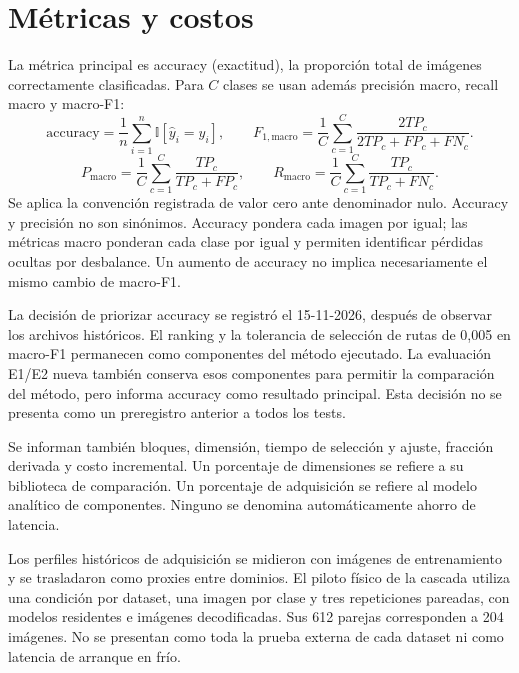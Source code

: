 \section{Métricas y costos}
La métrica principal es accuracy (exactitud), la proporción total de imágenes correctamente clasificadas. Para \(C\) clases se usan además precisión macro, recall macro y macro-F1:
\begin{equation}
\mathrm{accuracy}=\frac{1}{n}\sum_{i=1}^{n}\mathbb I[\widehat y_i=y_i],\qquad
F_{1,\mathrm{macro}}=\frac1C\sum_{c=1}^{C}
\frac{2TP_c}{2TP_c+FP_c+FN_c}.
\label{eq:tk-metrics}
\end{equation}
\begin{equation}
P_{\mathrm{macro}}=\frac1C\sum_{c=1}^{C}\frac{TP_c}{TP_c+FP_c},\qquad
R_{\mathrm{macro}}=\frac1C\sum_{c=1}^{C}\frac{TP_c}{TP_c+FN_c}.
\end{equation}
Se aplica la convención registrada de valor cero ante denominador nulo. Accuracy y precisión no son sinónimos. Accuracy pondera cada imagen por igual; las métricas macro ponderan cada clase por igual y permiten identificar pérdidas ocultas por desbalance. Un aumento de accuracy no implica necesariamente el mismo cambio de macro-F1.

La decisión de priorizar accuracy se registró el 15-11-2026, después de observar los archivos históricos. El ranking y la tolerancia de selección de rutas de 0,005 en macro-F1 permanecen como componentes del método ejecutado. La evaluación E1/E2 nueva también conserva esos componentes para permitir la comparación del método, pero informa accuracy como resultado principal. Esta decisión no se presenta como un preregistro anterior a todos los tests.

Se informan también bloques, dimensión, tiempo de selección y ajuste, fracción derivada y costo incremental. Un porcentaje de dimensiones se refiere a su biblioteca de comparación. Un porcentaje de adquisición se refiere al modelo analítico de componentes. Ninguno se denomina automáticamente ahorro de latencia.

Los perfiles históricos de adquisición se midieron con imágenes de entrenamiento y se trasladaron como proxies entre dominios. El piloto físico de la cascada utiliza una condición por dataset, una imagen por clase y tres repeticiones pareadas, con modelos residentes e imágenes decodificadas. Sus 612 parejas corresponden a 204 imágenes. No se presentan como toda la prueba externa de cada dataset ni como latencia de arranque en frío.


